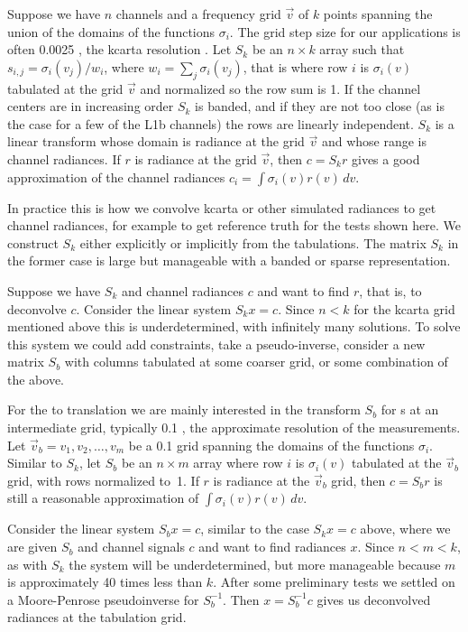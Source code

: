 \documentclass[11pt]{article}
\begin{document}
Suppose we have $n$ channels and a frequency grid $\vec v$ of $k$
points spanning the union of the domains of the functions
$\sigma_i$.  The grid step size for our applications is often 0.0025
{\wn}, the kcarta resolution \cite{kcarta1}.  Let $S_k$ be an
$n\times k$ array such that $s_{i,j} = \sigma_i(v_j)/w_i$, where
$w_i = \sum_j \sigma_i(v_j)$, that is where row $i$ is $\sigma_i(v)$
tabulated at the grid $\vec v$ and normalized so the row sum is 1.
If the channel centers are in increasing order $S_k$ is banded, and
if they are not too close (as is the case for a few of the L1b
channels) the rows are linearly independent.  $S_k$ is a linear
transform whose domain is radiance at the grid $\vec v$ and whose
range is channel radiances.  If $r$ is radiance at the grid $\vec
v$, then $c = S_k r$ gives a good approximation of the channel
radiances $c_i = \int\sigma_i(v)r(v)\,dv$.

In practice this is how we convolve kcarta or other simulated
radiances to get {\airs} channel radiances, for example to get
reference truth for the tests shown here.  We construct $S_k$ either
explicitly or implicitly from the {\airs} {\srf} tabulations.  The
matrix $S_k$ in the former case is large but manageable with a
banded or sparse representation.

Suppose we have $S_k$ and channel radiances $c$ and want to find
$r$, that is, to deconvolve $c$.  Consider the linear system $S_k x
= c$.  Since $n < k$ for the kcarta grid mentioned above this is
underdetermined, with infinitely many solutions.  To solve this
system we could add constraints, take a pseudo-inverse, consider a
new matrix $S_b$ with columns tabulated at some coarser grid, or
some combination of the above.

For the {\airs} to {\cris} translation we are mainly interested in 
the transform $S_b$ for {\srf}s at an intermediate grid, typically
0.1 {\wn}, the approximate resolution of the {\srf} measurements.
Let $\vec v_b = v_1,v_2,\ldots,v_m$ be a 0.1 {\wn} grid spanning the
domains of the functions $\sigma_i$.  Similar to $S_k$, let $S_b$ be
an $n\times m$ array where row $i$ is $\sigma_i(v)$ tabulated at the
$\vec v_b$ grid, with rows normalized to~1.  If $r$ is radiance at
the $\vec v_b$ grid, then $c = S_b r$ is still a reasonable
approximation of $\int\sigma_i(v)r(v)\,dv$.

Consider the linear system $S_b x = c$, similar to the case $S_k x =
c$ above, where we are given $S_b$ and channel signals $c$ and want
to find radiances $x$.  Since $n < m < k$, as with $S_k$ the system
will be underdetermined, but more manageable because $m$ is
approximately 40 times less than $k$.  After some preliminary tests
we settled on a Moore-Penrose pseudoinverse for $S_b^{-1}$.  Then $x
= S_b^{-1} c$ gives us deconvolved radiances at the {\srf} tabulation
grid.  
\end{document}
